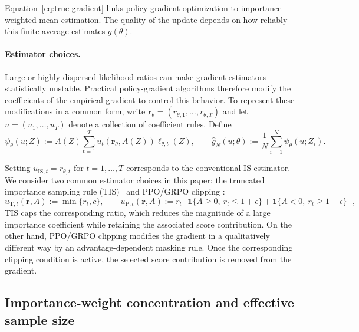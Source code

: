 \documentclass[11pt]{article}
\theoremstyle{remark}
\begin{document}
 Equation~\eqref{eq:true-gradient} links policy-gradient optimization to importance-weighted mean estimation. The quality of the update depends on how reliably this finite average estimates $g(\theta)$.

\paragraph{Estimator choices.}
Large or highly dispersed likelihood ratios can make
gradient estimators statistically unstable. Practical
policy-gradient algorithms therefore modify the coefficients of the empirical gradient to control this behavior. To represent these modifications in a common form,
write
$\mathbf r_\theta=(r_{\theta,1},\ldots,r_{\theta,T})$ and let
$u=(u_1,\ldots,u_T)$ denote a collection of coefficient rules. Define
\begin{equation}
 \psi_\theta(u;Z)
 :=
 A(Z)\sum_{t=1}^T
 u_t(\mathbf r_\theta,A(Z))
 \ell_{\theta,t}(Z),
 \qquad
 \widehat g_N(u;\theta)
 :=
 \frac1N\sum_{i=1}^N
 \psi_\theta(u;Z_i).
 \label{eq:coefficient-rule-estimator}
\end{equation}

Setting $u_{\mathrm{IS},t}=r_{\theta,t}$ for $t=1,\ldots,T$ corresponds to the conventional IS estimator. We consider two common estimator choices in this paper: the truncated importance sampling rule (TIS)~\citep{minimax2025m1} and PPO/GRPO clipping \citep{schulman2017ppo,shao2024deepseekmath}:
\begin{equation*}
 u_{\mathrm{T},t}(\mathbf r,A)
 :=
 \min\{r_t,c\}, \qquad  u_{\mathrm{P},t}(\mathbf r,A)
 :=
 r_t
 \left[
 \mathbf 1\{A\ge0,\ r_t\le1+\epsilon\}
 +
 \mathbf 1\{A<0,\ r_t\ge1-\epsilon\}\right],
 \label{eq:tis-coefficient-rule}
\end{equation*}
TIS caps the corresponding ratio, which reduces the magnitude of a large importance coefficient while retaining the associated score contribution. On the other hand, PPO/GRPO clipping modifies the gradient in a qualitatively different way by an advantage-dependent masking
rule. Once the corresponding clipping condition is active, the selected score contribution is removed from the gradient.

\subsection{Importance-weight concentration and effective sample size}
\end{document}
